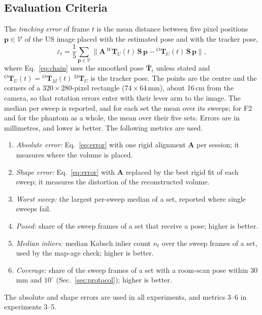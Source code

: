 \documentclass[9pt,shortpaper,twoside,web]{ieeecolor2}
\newcommand{\Tf}[2]{{}^{#1}\mathbf{T}_{#2}}
\newcommand{\Ftwo}{F2}
\begin{document}
\subsection{Evaluation Criteria}
\label{sec:metrics}
The \emph{tracking error} of frame $t$ is the mean distance between five pixel positions $\mathbf{p}\in\mathcal{V}$ of the US image placed with the estimated pose and with the tracker pose,
\begin{equation}
  \varepsilon_t=\frac{1}{5}\sum_{\mathbf{p}\in\mathcal{V}}\big\|\mathbf{A}\,\Tf{W}{U}(t)\,\mathbf{S}\,\mathbf{p}-\Tf{O}{U}(t)\,\mathbf{S}\,\mathbf{p}\big\|,
  \label{eq:error}
\end{equation}
where Eq.~\eqref{eq:chain} uses the smoothed pose $\bar{\mathbf{T}}_t$ unless stated and $\Tf{O}{U}(t)=\Tf{O}{M}(t)\,\Tf{M}{U}$ is the tracker pose. The points are the centre and the corners of a $320\times280$-pixel rectangle ($74\times64$\,mm), about 16\,cm from the camera, so that rotation errors enter with their lever arm to the image. The median per sweep is reported, and for each set the mean over its sweeps; for \Ftwo{} and for the phantom as a whole, the mean over their five sets. Errors are in millimetres, and lower is better. The following metrics are used.
\begin{enumerate}
  \setlength{\itemsep}{0pt}\setlength{\topsep}{2pt}
  \item \emph{Absolute error:} Eq.~\eqref{eq:error} with one rigid alignment $\mathbf{A}$ per session; it measures where the volume is placed.
  \item \emph{Shape error:} Eq.~\eqref{eq:error} with $\mathbf{A}$ replaced by the best rigid fit of each sweep; it measures the distortion of the reconstructed volume.
  \item \emph{Worst sweep:} the largest per-sweep median of a set, reported where single sweeps fail.
  \item \emph{Posed:} share of the sweep frames of a set that receive a pose; higher is better.
  \item \emph{Median inliers:} median Kabsch inlier count $n_t$ over the sweep frames of a set, used by the map-age check; higher is better.
  \item \emph{Coverage:} share of the sweep frames of a set with a room-scan pose within 30\,mm and $10^\circ$ (Sec.~\ref{sec:protocol}); higher is better.
\end{enumerate}
The absolute and shape errors are used in all experiments, and metrics 3--6 in experiments 3--5.
\end{document}
